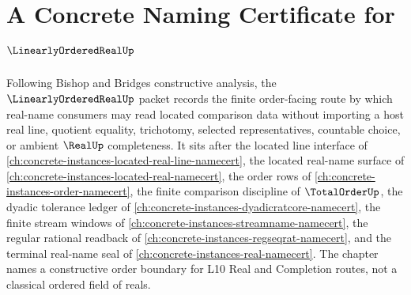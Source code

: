 \chapter{A Concrete Naming Certificate for $\LinearlyOrderedRealUp$}
\label{ch:concrete-instances-linearly-ordered-real-namecert}

Following Bishop and Bridges constructive analysis, the $\LinearlyOrderedRealUp$ packet records the finite order-facing route by which real-name consumers may read located comparison data without importing a host real line, quotient equality, trichotomy, selected representatives, countable choice, or ambient $\RealUp$ completeness. It sits after the located line interface of \autoref{ch:concrete-instances-located-real-line-namecert}, the located real-name surface of \autoref{ch:concrete-instances-located-real-namecert}, the order rows of \autoref{ch:concrete-instances-order-namecert}, the finite comparison discipline of $\TotalOrderUp$, the dyadic tolerance ledger of \autoref{ch:concrete-instances-dyadicratcore-namecert}, the finite stream windows of \autoref{ch:concrete-instances-streamname-namecert}, the regular rational readback of \autoref{ch:concrete-instances-regseqrat-namecert}, and the terminal real-name seal of \autoref{ch:concrete-instances-real-namecert}. The chapter names a constructive order boundary for L10 Real and Completion routes, not a classical ordered field of reals.

